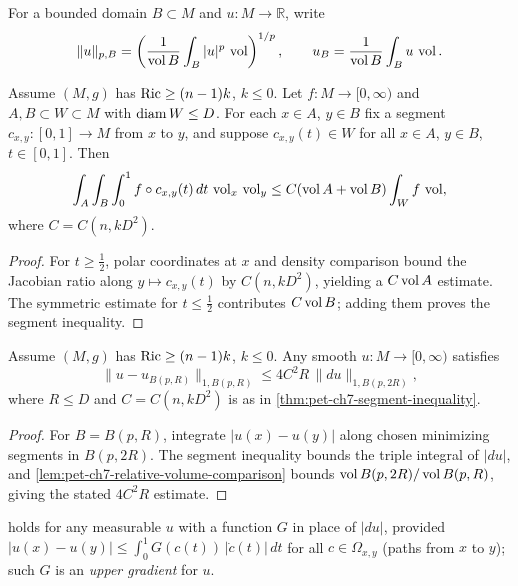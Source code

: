 For a bounded domain $B\subset M$ and $u:M\to\mathbb{R}$, write
\[
  \|u\|_{p,B}=\left(\frac{1}{\operatorname{vol} B}\int_B|u|^p\,\operatorname{vol}\right)^{1/p},\qquad
  u_B=\frac{1}{\operatorname{vol} B}\int_Bu\,\operatorname{vol}.
\]

\begin{theorem}
  \label{thm:pet-ch7-segment-inequality}

  Assume $(M,g)$ has $\operatorname{Ric}\ge(n-1)k$, $k\le0$. Let $f:M\to[0,\infty)$ and
  $A,B\subset W\subset M$ with $\operatorname{diam} W\le D$. For each $x\in A$, $y\in B$ fix a
  segment $c_{x,y}:[0,1]\to M$ from $x$ to $y$, and suppose $c_{x,y}(t)\in W$
  for all $x\in A$, $y\in B$, $t\in[0,1]$. Then
  \[
    \int_A\int_B\int_0^1 f\circ c_{x,y}(t)\,dt\,\operatorname{vol}_x\,\operatorname{vol}_y
    \le C(\operatorname{vol} A+\operatorname{vol} B)\int_Wf\,\operatorname{vol},
  \]
  where $C=C(n,kD^2)$.
\end{theorem}
\begin{proof}
  \sketch
  For \(t\ge\frac12\), polar coordinates at \(x\) and density comparison bound the Jacobian ratio along \(y\mapsto c_{x,y}(t)\) by \(C(n,kD^2)\), yielding a \(C\operatorname{vol} A\) estimate. The symmetric estimate for \(t\le\frac12\) contributes \(C\operatorname{vol} B\); adding them proves the segment inequality.
\end{proof}

\begin{corollary}
  \label{cor:pet-ch7-weak-poincare}

  Assume $(M,g)$ has $\operatorname{Ric}\ge(n-1)k$, $k\le0$. Any smooth $u:M\to[0,\infty)$
  satisfies
  \[
    \|u-u_{B(p,R)}\|_{1,B(p,R)}\le4C^2R\,\|du\|_{1,B(p,2R)},
  \]
  where $R\le D$ and $C=C(n,kD^2)$ is as in \cref{thm:pet-ch7-segment-inequality}.
\end{corollary}
\begin{proof}
  \sketch
  For \(B=B(p,R)\), integrate \(|u(x)-u(y)|\) along chosen minimizing segments in \(B(p,2R)\). The segment inequality bounds the triple integral of \(|du|\), and \cref{lem:pet-ch7-relative-volume-comparison} bounds \(\operatorname{vol} B(p,2R)/\operatorname{vol} B(p,R)\), giving the stated \(4C^2R\) estimate.
\end{proof}

\begin{remark}
  \label{rem:pet-ch7-upper-gradient}

   holds for any measurable $u$ with a function
  $G$ in place of $|du|$, provided $|u(x)-u(y)|\le\int_0^1G(c(t))\,|\dot
  c(t)|\,dt$ for all $c\in\Omega_{x,y}$ (paths from $x$ to $y$); such $G$ is an
  \emph{upper gradient} for $u$.
\end{remark}

